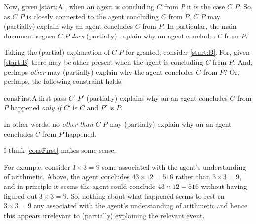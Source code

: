 \begin{note}
  Now, given \ref{start:A}, when an agent is concluding \(C\) from \(P\) it is the case \(C\) \fof{} \(P\).
  So, as \(C\)  \(P\) is closely connected to the agent concluding \(C\) from \(P\), \(C\)  \(P\) may (partially) explain why an agent concludes \(C\) from \(P\).
  In particular, the main document argues \(C\)  \(P\) \emph{does} (partially) explain why an agent concludes \(C\) from \(P\).

  Taking the (partial) explanation of \(C\)  \(P\) for granted, consider \ref{start:B}.
  For, given \ref{start:B} there may be other  present when the agent is concluding \(C\) from \(P\).
  And, perhaps \emph{other}  may (partially) explain why the agent concludes \(C\) from \(P\)?
  Or, perhaps, the following constraint holds:

  \begin{constraint}{consFirst}{A first pass}
    \(C'\) \fingf{} \(P'\) (partially) explains why an  an agent concludes \(C\) from \(P\) happened \emph{only if} \(C'\) is \(C\) and \(P'\) is \(P\).
  \end{constraint}

  \noindent%
  In other words, no \fingfr{} \emph{other than} \(C\) \fingf{} \(P\) may (partially) explain why an  an agent concludes \(C\) from \(P\) happened.
\end{note}


\begin{note}
  I think \autoref{consFirst} makes some sense.

  For example, consider \(3 \times 3 = 9\) \fingf{} some \pool{} associated with the agent's understanding of arithmetic.
  Above, the agent concludes \(43 \times 12 = 516\) rather than \(3 \times 3 = 9\), and in principle it seems the agent could conclude \(43 \times 12 = 516\) without having figured out \(3 \times 3 = 9\).
  So, nothing about what happened seems to rest on \(3 \times 3 = 9\) \fingf{} any \pool{} associated with the agent's understanding of arithmetic and hence this \fingfr{} appears irrelevant to (partially) explaining the relevant event.
\end{note}


